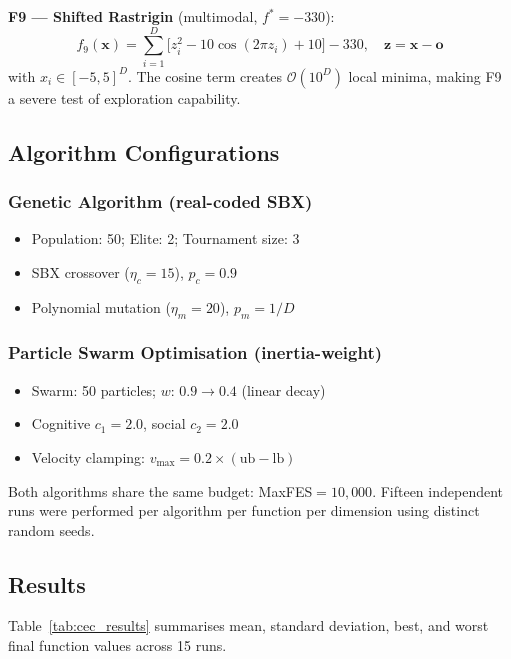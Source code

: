 \documentclass[10pt,twocolumn,a4paper]{article}
\begin{document}
\textbf{F9 --- Shifted Rastrigin} (multimodal, $f^*=-330$):
\begin{equation}
  f_9(\bm{x}) = \sum_{i=1}^{D}\!\bigl[z_i^2 - 10\cos(2\pi z_i)+10\bigr] - 330,
  \quad \bm{z}=\bm{x}-\bm{o}
\end{equation}
with $x_i\in[-5,5]^D$. The cosine term creates $\mathcal{O}(10^D)$ local minima, making F9 a severe test of exploration capability.

\subsection{Algorithm Configurations}

\subsubsection{Genetic Algorithm (real-coded SBX)}
\begin{itemize}[leftmargin=*, noitemsep, topsep=1pt]
  \item Population: 50; Elite: 2; Tournament size: 3
  \item SBX crossover ($\eta_c=15$), $p_c=0.9$
  \item Polynomial mutation ($\eta_m=20$), $p_m=1/D$
\end{itemize}

\subsubsection{Particle Swarm Optimisation (inertia-weight)}
\begin{itemize}[leftmargin=*, noitemsep, topsep=1pt]
  \item Swarm: 50 particles; $w$: $0.9\to0.4$ (linear decay)
  \item Cognitive $c_1=2.0$, social $c_2=2.0$
  \item Velocity clamping: $v_{\max}=0.2\times(\text{ub}-\text{lb})$
\end{itemize}

Both algorithms share the same budget: MaxFES$=10{,}000$. Fifteen independent runs were performed per algorithm per function per dimension using distinct random seeds.

\subsection{Results}

Table~\ref{tab:cec_results} summarises mean, standard deviation, best, and worst final function values across 15 runs.
\end{document}
